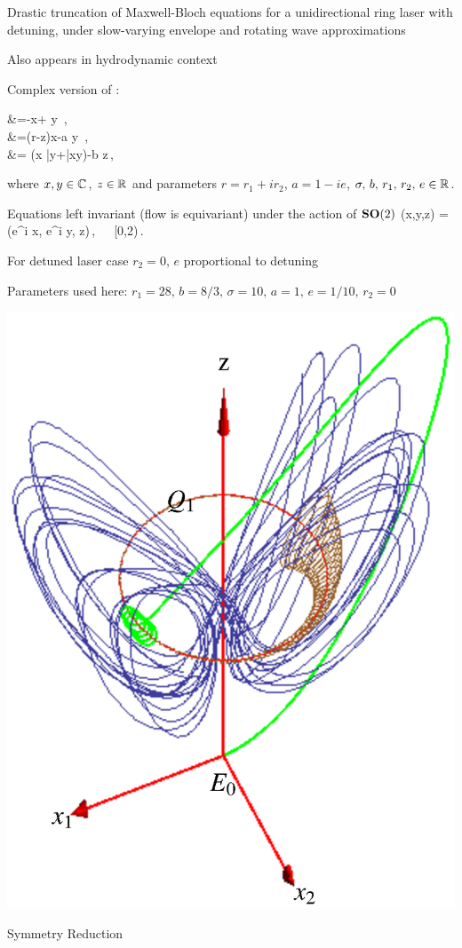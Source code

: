 \documentclass{theo1poster}[2003/04/25]
\renewcommand{\labelitemi}{\ding{228}}
\renewenvironment{itemize}%
 {\begin{list}{\labelitemi}%
       {%
        \setlength{\leftmargin}{0pt}%
        \setlength{\itemindent}{0pt}%
        \settowidth{\labelwidth}{\labelitemi}%
        \addtolength{\labelsep}{\itemindent}
        \addtolength{\leftmargin}{\labelwidth}%
        \addtolength{\leftmargin}{\labelsep}%
        \addtolength{\leftmargin}{-\itemindent}%
       }%
 }
 {\end{list}}
\begin{document}
\begin{poster}{3}
\begin{sheet}{\CLe}
 \large
 \begin{itemize}
 \item Drastic truncation of Maxwell-Bloch equations for a unidirectional ring laser with detuning,
	under slow-varying envelope and rotating wave approximations
 \item Also appears in hydrodynamic context 
 \item Complex version of \Le:
	\beq
	\begin{split}
	 &=-\sigma x+ \sigma y \,,\\
	 &=(r-z)x-a y \,,\\
	 &= \left(x \bar{y}+\bar{x}y\right)-b z\,,
	\label{eq:CLe}
	\end{split}
	\eeq
	where $x,y\in\mathbb{C}^{}$, $z\in\mathbb{R}^{}$ and parameters $r=r_1+i r_2$, $a=1-i e$, $\sigma,\,b,\,r_1,\,r_2,\, e\in\mathbb{R}^{}$.
 \item Equations left invariant (flow is equivariant) under the action of $\mathbf{SO}(2)$
	\beq
		\Rot{\theta} (x,y,z) = (e^{i\theta} x, e^{i\theta} y, z)\,,\ \ \  \theta\in[0,2\pi)\,.
		\label{eq:RotCLe}
	\eeq
 \item For detuned laser case $r_2=0$, $e$ proportional to detuning
 \item Parameters used here: $r_1=28,\, b=8/3,\, \sigma=10,\, a=1,\, e=1/10,\, r_2=0$\\
 \centerline{
		\includegraphics[width=.25\textwidth]{../../figs/CLE.eps}
}
\end{itemize}
 
\end{sheet}




\begin{sheet}{Symmetry Reduction}


\end{sheet}
\end{poster}
\end{document}
